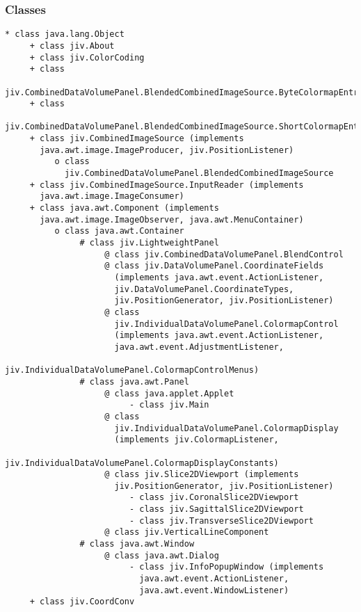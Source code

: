 \subsubsection{Classes}
\small
\begin{verbatim}
* class java.lang.Object
     + class jiv.About
     + class jiv.ColorCoding
     + class
       jiv.CombinedDataVolumePanel.BlendedCombinedImageSource.ByteColormapEntries
     + class
       jiv.CombinedDataVolumePanel.BlendedCombinedImageSource.ShortColormapEntries
     + class jiv.CombinedImageSource (implements
       java.awt.image.ImageProducer, jiv.PositionListener)
          o class
            jiv.CombinedDataVolumePanel.BlendedCombinedImageSource
     + class jiv.CombinedImageSource.InputReader (implements
       java.awt.image.ImageConsumer)
     + class java.awt.Component (implements
       java.awt.image.ImageObserver, java.awt.MenuContainer)
          o class java.awt.Container
               # class jiv.LightweightPanel
                    @ class jiv.CombinedDataVolumePanel.BlendControl
                    @ class jiv.DataVolumePanel.CoordinateFields
                      (implements java.awt.event.ActionListener,
                      jiv.DataVolumePanel.CoordinateTypes,
                      jiv.PositionGenerator, jiv.PositionListener)
                    @ class
                      jiv.IndividualDataVolumePanel.ColormapControl
                      (implements java.awt.event.ActionListener,
                      java.awt.event.AdjustmentListener,
                      jiv.IndividualDataVolumePanel.ColormapControlMenus)
               # class java.awt.Panel
                    @ class java.applet.Applet
                         - class jiv.Main
                    @ class
                      jiv.IndividualDataVolumePanel.ColormapDisplay
                      (implements jiv.ColormapListener,
                      jiv.IndividualDataVolumePanel.ColormapDisplayConstants)
                    @ class jiv.Slice2DViewport (implements
                      jiv.PositionGenerator, jiv.PositionListener)
                         - class jiv.CoronalSlice2DViewport
                         - class jiv.SagittalSlice2DViewport
                         - class jiv.TransverseSlice2DViewport
                    @ class jiv.VerticalLineComponent
               # class java.awt.Window
                    @ class java.awt.Dialog
                         - class jiv.InfoPopupWindow (implements
                           java.awt.event.ActionListener,
                           java.awt.event.WindowListener)
     + class jiv.CoordConv

\end{verbatim}

